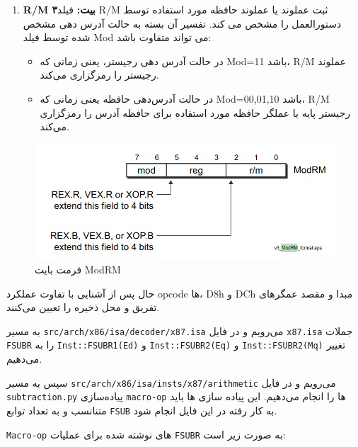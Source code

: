 \documentclass[12pt]{exam}
\begin{document}
\begin{multicols}{1}
\begin{enumerate}
	
	\item \textbf{R/M ۳بیت: }
فیلد R/M ثبت عملوند یا عملوند حافظه مورد استفاده توسط دستورالعمل را مشخص می کند. تفسیر آن بسته به حالت آدرس دهی مشخص شده توسط فیلد Mod می تواند متفاوت باشد:
	\begin{itemize}
		\item در حالت آدرس دهی رجیستر، یعنی زمانی که Mod=11 باشد، R/M عملوند رجیستر را رمزگزاری می‌کند.
		
		\item در حالت آدرس‌دهی حافظه یعنی زمانی که Mod=00,01,10 باشد، R/M رجیستر پایه یا عملگر حافظه مورد استفاده برای حافظه آدرس را رمزگزاری می‌کند.
	\end{itemize}
\end{enumerate}

\begin{center}
	\begin{figure}[H]
		\includegraphics[scale=0.3]{images/img1.png}
		\caption{فرمت بایت ModRM}
		\label{فرمت بایت}
	\end{figure}
\end{center}

حال پس از آشنایی با تفاوت عملکرد opcode ها، D8h و DCh مبدا و مقصد عمگرهای تفریق و محل ذخیره را تعیین می‌کنند.

به مسیر \texttt{src/arch/x86/isa/decoder/x87.isa} می‌رویم و در فایل \texttt{x87.isa} جملات \texttt{FSUBR} را به \texttt{Inst::FSUBR1(Ed)} و \texttt{Inst::FSUBR2(Eq)} و  \texttt{Inst::FSUBR2(Mq)} تغییر می‌دهیم.

سپس به مسیر \texttt{src/arch/x86/isa/insts/x87/arithmetic} می‌رویم و در فایل \texttt{subtraction.py} پیاده‌سازی \texttt{macro-op} ها را انجام می‌دهیم. این پیاده سازی ها باید متنانسب و به تعداد توابع \texttt{FSUB} به کار رفته در این فایل انجام شود. 

\texttt{Macro-op} های نوشته شده برای عملیات \texttt{FSUBR} به صورت زیر است:
\begin{latin}
	
\end{latin}


\end{multicols}
\end{document}
